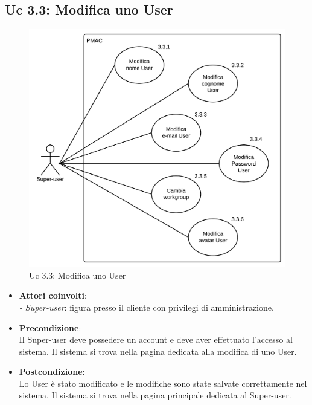 {\subsection{Uc 3.3: Modifica uno User}
\begin{figure}[ht]
\centering
\caption{Uc 3.3: Modifica uno User}
\includegraphics[scale=0.9]{images/cap1/UseCase/Uc3_3} %
\end{figure}

\begin{itemize}
\item \textbf{Attori coinvolti}:\\
\emph{- Super-user}: figura presso il cliente con privilegi di amministrazione.

\item \textbf{Precondizione}:\\
Il Super-user deve possedere un account e deve aver effettuato l'accesso al sistema. Il sistema si trova nella pagina dedicata alla modifica di uno User.

\item \textbf{Postcondizione}:\\
Lo User è stato modificato e le modifiche sono state salvate correttamente nel sistema. Il sistema si trova nella pagina principale dedicata al Super-user.


\end{itemize}}
